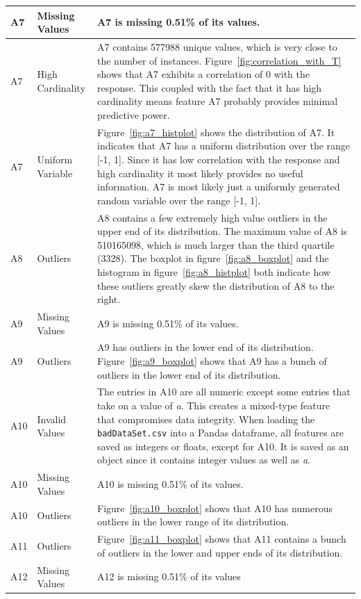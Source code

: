 \documentclass[11pt]{report}
\begin{document}
\begin{longtable}{lp{5cm}p{8cm}}
\midrule
A7 & Missing Values & A7 is missing 0.51\% of its values. \\
\midrule
A7 & High Cardinality & A7 contains 577988 unique values, which is very close to the number of instances. Figure~\ref{fig:correlation_with_T} shows that A7 exhibits a correlation of 0 with the response. This coupled with the fact that it has high cardinality means feature A7 probably provides minimal predictive power. \\
\midrule
A7 & Uniform Variable & Figure~\ref{fig:a7_histplot} shows the distribution of A7. It indicates that A7 has a uniform distribution over the range [-1, 1]. Since it has low correlation with the response and high cardinality it most likely provides no useful information. A7 is most likely just a uniformly generated random variable over the range [-1, 1]. \\
\midrule
A8 & Outliers & A8 contains a few extremely high value outliers in the upper end of its distribution. The maximum value of A8 is 510165098, which is much larger than the third quartile (3328). The boxplot in figure~\ref{fig:a8_boxplot} and the histogram in figure~\ref{fig:a8_histplot} both indicate how these outliers greatly skew the distribution of A8 to the right. \\
\midrule
A9 & Missing Values & A9 is missing 0.51\% of its values. \\
\midrule
A9 & Outliers & A9 has outliers in the lower end of its distribution. Figure~\ref{fig:a9_boxplot} shows that A9 has a bunch of outliers in the lower end of its distribution. \\
\midrule
A10 & Invalid Values & The entries in A10 are all numeric except some entries that take on a value of \textit{a}. This creates a mixed-type feature that compromises data integrity. When loading the \texttt{badDataSet.csv} into a Pandas dataframe, all features are saved as integers or floats, except for A10. It is saved as an object since it contains integer values as well as \textit{a}. \\
\midrule
A10 & Missing Values & A10 is missing 0.51\% of its values. \\
\midrule
A10 & Outliers & Figure~\ref{fig:a10_boxplot} shows that A10 has numerous outliers in the lower range of its distribution. \\
\midrule
A11 & Outliers & Figure~\ref{fig:a11_boxplot} shows that A11 contains a bunch of outliers in the lower and upper ends of its distribution. \\
\midrule
A12 & Missing Values & A12 is missing 0.51\% of its values \\

\end{longtable}
\end{document}

